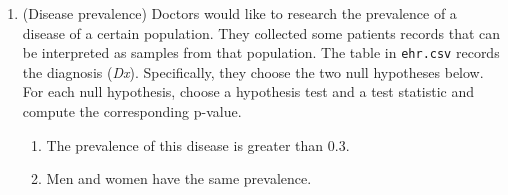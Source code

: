 \documentclass[12pt,twoside]{article}
\begin{document}
\begin{enumerate}
\item (Disease prevalence)
Doctors would like to research the prevalence of a disease of a certain population. They collected some patients records that can be interpreted as samples from that population. The table in \texttt{ehr.csv} records the diagnosis (\textit{Dx}). Specifically, they choose the two null hypotheses below. For each null hypothesis, choose a hypothesis test and a test statistic and compute the corresponding p-value. 
\begin{enumerate}
\item The prevalence of this disease is greater than 0.3.
\item Men and women have the same prevalence.
\end{enumerate}

\end{enumerate}
\end{document}
